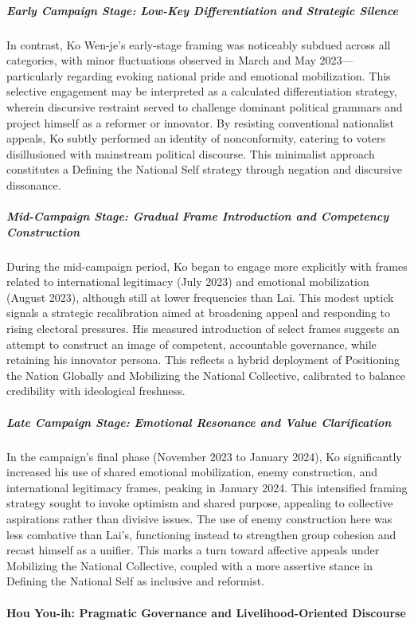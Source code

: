\documentclass[man,12pt]{apa7}
\begin{document}
\subparagraph{Early Campaign Stage: Low-Key Differentiation and Strategic Silence}

In contrast, Ko Wen-je's early-stage framing was noticeably subdued across all categories, with minor fluctuations observed in March and May 2023—particularly regarding evoking national pride and emotional mobilization. This selective engagement may be interpreted as a calculated differentiation strategy, wherein discursive restraint served to challenge dominant political grammars and project himself as a reformer or innovator. By resisting conventional nationalist appeals, Ko subtly performed an identity of nonconformity, catering to voters disillusioned with mainstream political discourse. This minimalist approach constitutes a Defining the National Self strategy through negation and discursive dissonance.

\subparagraph{Mid-Campaign Stage: Gradual Frame Introduction and Competency Construction}

During the mid-campaign period, Ko began to engage more explicitly with frames related to international legitimacy (July 2023) and emotional mobilization (August 2023), although still at lower frequencies than Lai. This modest uptick signals a strategic recalibration aimed at broadening appeal and responding to rising electoral pressures. His measured introduction of select frames suggests an attempt to construct an image of competent, accountable governance, while retaining his innovator persona. This reflects a hybrid deployment of Positioning the Nation Globally and Mobilizing the National Collective, calibrated to balance credibility with ideological freshness.

\subparagraph{Late Campaign Stage: Emotional Resonance and Value Clarification}

In the campaign's final phase (November 2023 to January 2024), Ko significantly increased his use of shared emotional mobilization, enemy construction, and international legitimacy frames, peaking in January 2024. This intensified framing strategy sought to invoke optimism and shared purpose, appealing to collective aspirations rather than divisive issues. The use of enemy construction here was less combative than Lai's, functioning instead to strengthen group cohesion and recast himself as a unifier. This marks a turn toward affective appeals under Mobilizing the National Collective, coupled with a more assertive stance in Defining the National Self as inclusive and reformist.

\paragraph{Hou You-ih: Pragmatic Governance and Livelihood-Oriented Discourse}
\end{document}
